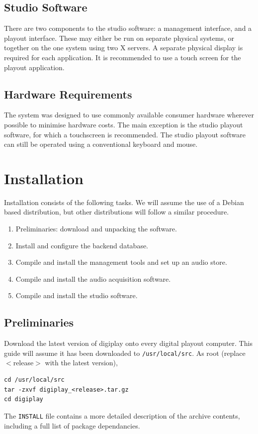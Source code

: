 \documentclass[a4paper,12pt]{report}
\numberwithin{equation}{section}
\begin{document}
\section{Studio Software}
There are two components to the studio software: a management interface, and a playout interface. These may either be run on separate physical systems, or together on the one system using two X servers. A separate physical display is required for each application. It is recommended to use a touch screen for the playout application.

\section{Hardware Requirements}
The system was designed to use commonly available consumer hardware wherever possible to minimise hardware costs. The main exception is the studio playout software, for which a touchscreen is recommended. The studio playout software can still be operated using a conventional keyboard and mouse.

\chapter{Installation}
Installation consists of the following tasks. We will assume the use of a Debian based distribution, but other distributions will follow a similar procedure.
\begin{enumerate}
\item Preliminaries: download and unpacking the software.
\item Install and configure the backend database.
\item Compile and install the management tools and set up an audio store.
\item Compile and install the audio acquisition software.
\item Compile and install the studio software.
\end{enumerate}

\section{Preliminaries}
Download the latest version of digiplay onto every digital playout computer. This guide will assume it has been downloaded to \texttt{/usr/local/src}. As root (replace $<$release$>$ with the latest version),
\begin{lstlisting}
cd /usr/local/src
tar -zxvf digiplay_<release>.tar.gz
cd digiplay
\end{lstlisting}
The \texttt{INSTALL} file contains a more detailed description of the archive contents, including a full list of package dependancies.
\end{document}
